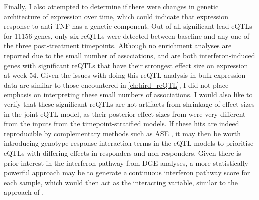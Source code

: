 Finally, I also attempted to determine if there were changes in genetic architecture of expression over time,
which could indicate that expression response to anti-\gls{TNF} has a genetic component.
Out of all significant lead \glspl{eQTL} for 11156 genes, only six \glspl{reQTL} were detected between baseline and any one of the three post-treatment timepoints.
Although no enrichment analyses are reported due to the small number of associations, 
 and  are both interferon-induced genes with significant \glspl{reQTL} that have their strongest effect size on expression at week 54.
Given the issues with doing this \gls{reQTL} analysis in bulk expression data are similar to those encountered in \cref{ch:hird_reQTL},
I did not place emphasis on interpreting these small numbers of associations.
I would also like to verify that these significant \glspl{reQTL} are not artifacts from shrinkage of effect sizes in the joint \gls{eQTL} model,
as their posterior effect sizes from  were very different from the inputs from the timepoint-stratified models.
If these hits are indeed reproducible by complementary methods such as \gls{ASE} \autocite{gutierrez-arcelus2020AllelespecificExpressionChanges},
it may then be worth introducing genotype-response interaction terms in the \gls{eQTL} models
to prioritise \glspl{eQTL} with differing effects in responders and non-responders.
Given there is prior interest in the interferon pathway from \gls{DGE} analyses,
a more statistically powerful approach may be to generate a continuous interferon pathway score for each sample,
which would then act as the interacting variable,
similar to the approach of \textcite{davenport2018DiscoveringVivoCytokineeQTL}.

